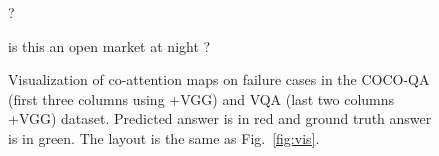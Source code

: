 \documentclass{article}
\def \fsize {1pt}
\begin{document}
\begin{figure}[tp]
\begin{minipage}{0.19\linewidth}
\begin{center}
{\textcolor[rgb]{1.0000,0.8141,0.0000}{?}
}
\end{center}
\end{minipage}
\begin{minipage}{0.19\linewidth}
\begin{center}
\tiny{
\setlength{\fboxsep}{\fsize}
\textcolor[rgb]{0.0000,0.0000,0.5713}{is}
\textcolor[rgb]{0.0000,0.0000,0.5713}{this}
\textcolor[rgb]{0.0000,0.0000,0.5891}{an}
\textcolor[rgb]{0.0000,0.0000,0.6961}{open}
\textcolor[rgb]{0.0000,0.2686,1.0000}{market}
\textcolor[rgb]{0.0095,0.9118,0.9583}{at}
\textcolor[rgb]{0.6799,1.0000,0.2878}{night}
\textcolor[rgb]{1.0000,0.6979,0.0000}{?}
}
\end{center}   
\end{minipage}
\caption{Visualization of co-attention maps on failure cases in the COCO-QA (first three columns using +VGG) and VQA (last two columns +VGG) dataset. Predicted answer is in red and ground truth answer is in green. The layout is the same as Fig.~\ref{fig:vis}.}
\label{fig:vis3}
\end{figure} {\small


}
\end{document}
